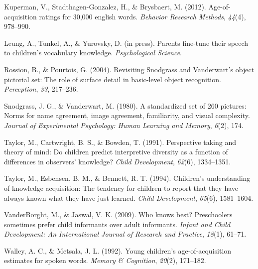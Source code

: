 \documentclass[10pt, letterpaper]{article}
\newenvironment{CSLReferences}%
  {}%
  {\par}
\begin{document}
\begin{CSLReferences}{1}{0}
\leavevmode\hypertarget{ref-kuperman2012}{}%
Kuperman, V., Stadthagen-Gonzalez, H., \& Brysbaert, M. (2012).
Age-of-acquisition ratings for 30,000 english words. \emph{Behavior
Research Methods}, \emph{44}(4), 978--990.

\leavevmode\hypertarget{ref-leung2021}{}%
Leung, A., Tunkel, A., \& Yurovsky, D. (in press). Parents fine-tune
their speech to children's vocabulary knowledge. \emph{Psychological
Science}.

\leavevmode\hypertarget{ref-rossion2004}{}%
Rossion, B., \& Pourtois, G. (2004). {Revisiting Snodgrass and
Vanderwart's object pictorial set: The role of surface detail in
basic-level object recognition}. \emph{Perception}, \emph{33}, 217--236.

\leavevmode\hypertarget{ref-snodgrass1980}{}%
Snodgrass, J. G., \& Vanderwart, M. (1980). A standardized set of 260
pictures: Norms for name agreement, image agreement, familiarity, and
visual complexity. \emph{Journal of Experimental Psychology: Human
Learning and Memory}, \emph{6}(2), 174.

\leavevmode\hypertarget{ref-taylor1991}{}%
Taylor, M., Cartwright, B. S., \& Bowden, T. (1991). Perspective taking
and theory of mind: Do children predict interpretive diversity as a
function of differences in observers' knowledge? \emph{Child
Development}, \emph{62}(6), 1334--1351.

\leavevmode\hypertarget{ref-taylor1994}{}%
Taylor, M., Esbensen, B. M., \& Bennett, R. T. (1994). Children's
understanding of knowledge acquisition: The tendency for children to
report that they have always known what they have just learned.
\emph{Child Development}, \emph{65}(6), 1581--1604.

\leavevmode\hypertarget{ref-vanderborght2009}{}%
VanderBorght, M., \& Jaswal, V. K. (2009). Who knows best? Preschoolers
sometimes prefer child informants over adult informants. \emph{Infant
and Child Development: An International Journal of Research and
Practice}, \emph{18}(1), 61--71.

\leavevmode\hypertarget{ref-walley1992}{}%
Walley, A. C., \& Metsala, J. L. (1992). Young children's
age-of-acquisition estimates for spoken words. \emph{Memory \&
Cognition}, \emph{20}(2), 171--182.

\end{CSLReferences}


\end{document}
